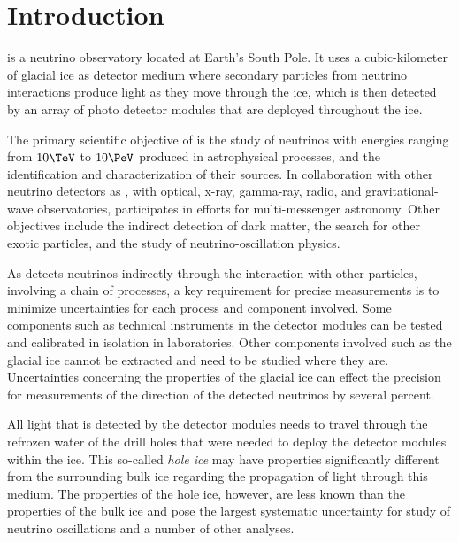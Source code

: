 
\section{Introduction}
\label{sec:intro}

\icecube is a neutrino observatory located at Earth's South Pole.
It uses a cubic-kilometer of glacial ice as detector medium where secondary particles from neutrino interactions produce light as they move through the ice, which is then detected by an array of photo detector modules that are deployed throughout the ice. \cite{evidence2013}

The primary scientific objective of \icecube is the study of neutrinos with energies ranging from $10\TeV$ to $10\PeV$ produced in astrophysical processes, and the identification and characterization of their sources. In collaboration with other neutrino detectors as , with optical, x-ray, gamma-ray, radio, and gravitational-wave observatories, \icecube participates in efforts for multi-messenger astronomy. Other objectives include the indirect detection of dark matter, the search for other exotic particles, and the study of neutrino-oscillation physics. \cite{instrumentation, evidence2013}

As \icecube detects neutrinos indirectly through the interaction with other particles, involving a chain of processes, a key requirement for precise measurements is to minimize uncertainties for each process and component involved. Some components such as technical instruments in the detector modules can be tested and calibrated in isolation in laboratories. Other components involved such as the glacial ice cannot be extracted and need to be studied where they are. Uncertainties concerning the properties of the glacial ice can effect the precision for measurements of the direction of the detected neutrinos by several percent. \cite{wrede}

All light that is detected by the detector modules needs to travel through the refrozen water of the drill holes that were needed to deploy the detector modules within the ice. This so-called \textit{hole ice} may have properties significantly different from the surrounding bulk ice regarding the propagation of light through this medium. The properties of the hole ice, however, are less known than the properties of the bulk ice and pose the largest systematic uncertainty for study of neutrino oscillations and a number of other analyses. \cite{icrc17pocam}

